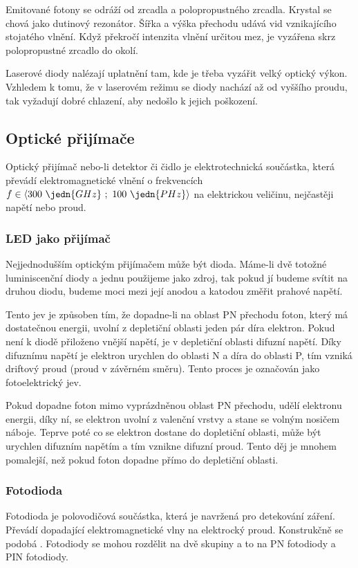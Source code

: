Emitované fotony se odráží od zrcadla a polopropustného zrcadla.  Krystal se chová jako dutinový rezonátor. Šířka a výška přechodu udává vid vznikajícího stojatého vlnění. Když překročí intenzita vlnění určitou mez, je vyzářena skrz polopropustné zrcadlo do okolí.

Laserové diody nalézají uplatnění tam, kde je třeba vyzářit velký optický výkon. Vzhledem k tomu, že v laserovém režimu se diody nachází až od vyššího proudu, tak vyžadují dobré chlazení, aby nedošlo k jejich poškození.

\subsection{Optické přijímače}
Optický přijímač nebo-li detektor či čidlo je elektrotechnická součástka, která převádí elektromagnetické vlnění o frekvencích $f \in \langle 300~\jedn{GHz}~;~100~\jedn{PHz} \rangle$ na elektrickou veličinu, nejčastěji napětí nebo proud.

\subsubsection{LED jako přijímač}
Nejjednodušším optickým přijímačem může být  dioda. Máme-li dvě totožné luminiscenční diody a jednu použijeme jako zdroj, tak pokud jí budeme svítit na druhou diodu, budeme moci mezi její anodou a katodou změřit prahové napětí.

Tento jev je způsoben tím, že dopadne-li na oblast PN přechodu foton, který má dostatečnou energii, uvolní z depletiční oblasti jeden pár díra elektron. Pokud není k diodě přiloženo vnější napětí, je v depletiční oblasti difuzní napětí. Díky difuznímu napětí je elektron urychlen do oblasti N a díra do oblasti P, tím vzniká driftový proud (proud v závěrném směru). Tento proces je označován jako fotoelektrický jev.

Pokud dopadne foton mimo vyprázdněnou oblast PN přechodu, udělí elektronu energii, díky ní, se elektron uvolní z valenční vrstvy a stane se volným nosičem náboje. Teprve poté co se elektron dostane do dopletiční oblasti, může být urychlen difuzním napětím a tím vznikne difuzní proud. Tento děj je mnohem pomalejší, než pokud foton dopadne přímo do depletiční oblasti.

\subsubsection{Fotodioda}
Fotodioda je polovodičová součástka, která je navržená pro detekování záření. Převádí dopadající elektromagnetické vlny na elektrocký proud. Konstrukčně se podobá . Fotodiody se mohou rozdělit na dvě skupiny a to na PN fotodiody a PIN fotodiody.

